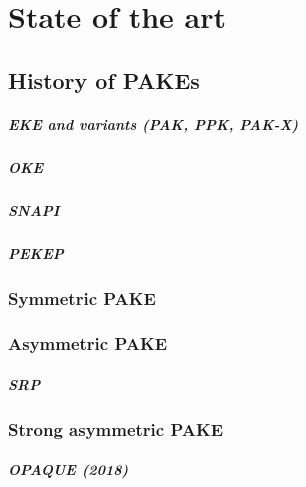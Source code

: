 \documentclass[../report.tex]{subfiles}
\begin{document}





\chapter{State of the art}

\section{History of PAKEs}
\paragraph{EKE and variants (PAK, PPK, PAK-X)}
\paragraph{OKE}
\paragraph{SNAPI}
\paragraph{PEKEP}
\subsection{Symmetric PAKE}
\subsection{Asymmetric PAKE}
\paragraph{SRP}
\subsection{Strong asymmetric PAKE}
\paragraph{OPAQUE (2018)}
\end{document}
